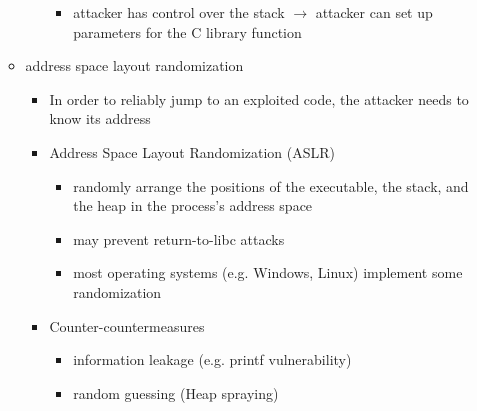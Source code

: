 \documentclass[final]{article}
\begin{document}
\begin{itemize}
\begin{itemize}[nosep]
\begin{itemize}[nosep]
\begin{itemize}[nosep]
                                  \item attacker has control over the stack $\rightarrow$ attacker can set up parameters for the C library function
                              \end{itemize}
                    \end{itemize}
              \item address space layout randomization
                    \begin{itemize}[nosep]
                        \item In order to reliably jump to an exploited code, the attacker needs to know its address
                        \item Address Space Layout Randomization (ASLR)
                              \begin{itemize}[nosep]
                                  \item randomly arrange the positions of the executable, the stack, and the heap in the process's address space
                                  \item may prevent return-to-libc attacks
                                  \item most operating systems (e.g. Windows, Linux) implement some randomization
                              \end{itemize}
                        \item Counter-countermeasures
                              \begin{itemize}[nosep]
                                  \item information leakage (e.g. printf vulnerability)
                                  \item random guessing (Heap spraying)
                              \end{itemize}
                    \end{itemize}
          \end{itemize}
\end{itemize}
\end{document}
